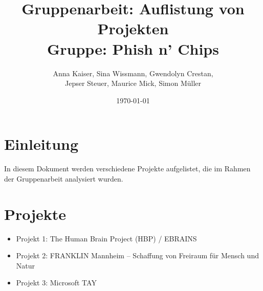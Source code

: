 \documentclass{article}
\title{
    \vspace*{5cm}
    Gruppenarbeit: Auflistung von Projekten \\ Gruppe: Phish n' Chips}
\author{Anna Kaiser, Sina Wissmann, Gwendolyn Crestan, \\ Jepser Steuer, Maurice Mick, Simon Müller}
\date{\today}
\begin{document}
\maketitle
\clearpage %
\section{Einleitung}
In diesem Dokument werden verschiedene Projekte aufgelistet, die im Rahmen der Gruppenarbeit analysiert wurden.

\section{Projekte}
\begin{itemize}
    \item Projekt 1: The Human Brain Project (HBP) / EBRAINS
    \item Projekt 2: FRANKLIN Mannheim – Schaffung von Freiraum für Mensch und Natur
    \item Projekt 3: Microsoft TAY
\end{itemize}

\clearpage

\end{document}
